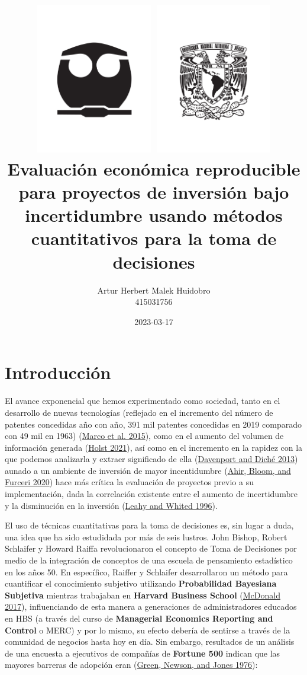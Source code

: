 \documentclass[
]{book}
\title{\includegraphics[width=2in,height=\textheight]{diagramas/FQ.jpg} \includegraphics[width=2in,height=\textheight]{diagramas/UNAM.jpg}
Evaluación económica reproducible para proyectos de inversión bajo incertidumbre usando métodos cuantitativos para la toma de decisiones}
\author{Artur Herbert Malek Huidobro\\
415031756}
\date{2023-03-17}
\begin{document}
\maketitle

{
\setcounter{tocdepth}{1}
\tableofcontents
}
\renewcommand{\figurename}{Figura}
\renewcommand{\listfigurename}{Lista de Figuras}
\renewcommand{\listtablename}{Lista de Tablas}
\renewcommand{\tablename}{Tabla}

\listoffigures

\listoftables

\newpage

\hypertarget{introducciuxf3n}{%
\chapter{Introducción}\label{introducciuxf3n}}

El avance exponencial que hemos experimentado como sociedad, tanto en el
desarrollo de nuevas tecnologías (reflejado en el incremento del número
de patentes concedidas año con año, 391 mil patentes concedidas en 2019
comparado con 49 mil en 1963) (\protect\hyperlink{ref-Marco2015}{Marco et al. 2015}), como en el aumento del
volumen de información generada (\protect\hyperlink{ref-Holst2021}{Holst 2021}), así como en el incremento
en la rapidez con la que podemos analizarla y extraer significado de
ella (\protect\hyperlink{ref-Davenport2013}{Davenport and Diché 2013}) aunado a un ambiente de inversión de mayor
incentidumbre (\protect\hyperlink{ref-Ahir2020}{Ahir, Bloom, and Furceri 2020}) hace más crítica la evaluación de proyectos
previo a su implementación, dada la correlación existente entre el
aumento de incertidumbre y la disminución en la inversión (\protect\hyperlink{ref-Leahy1996}{Leahy and Whited 1996}).

El uso de técnicas cuantitativas para la toma de decisiones es, sin lugar
a duda, una idea que ha sido estudidada por más de seis lustros. John
Bishop, Robert Schlaifer y Howard Raiffa revolucionaron el concepto de
Toma de Decisiones por medio de la integración de conceptos de una
escuela de pensamiento estadístico en los años 50. En específico,
Raiffer y Schlaifer desarrollaron un método para cuantificar el
conocimiento subjetivo utilizando \textbf{Probabilidad Bayesiana Subjetiva}
mientras trabajaban en \textbf{Harvard Business School}
(\protect\hyperlink{ref-Mcdonald2017Golden}{McDonald 2017}), influenciando de esta manera a generaciones de
administradores educados en HBS (a través del curso de \textbf{Managerial
Economics Reporting and Control} o MERC) y por lo mismo, su efecto
debería de sentirse a través de la comunidad de negocios hasta hoy en
día. Sin embargo, resultados de un análisis de una encuesta a ejecutivos
de compañías de \textbf{Fortune 500} indican que las mayores barreras de
adopción eran (\protect\hyperlink{ref-Green1976survey}{Green, Newson, and Jones 1976}):
\end{document}
